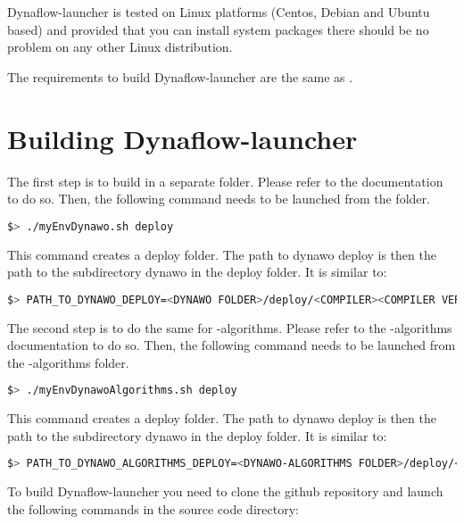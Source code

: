 \documentclass[a4paper, 12pt]{report}
\begin{document}
Dynaflow-launcher is tested on Linux platforms (Centos, Debian and Ubuntu based) and provided that you can install system packages there should be no problem on any other Linux distribution.

The requirements to build Dynaflow-launcher are the same as \Dynawo.

\section[Building Dynaflow-launcher]{Building Dynaflow-launcher}
\label{Dynaflow_launcher_Installation_Documentation_Building_Dynaflow_launcher}
The first step is to build \Dynawo in a separate folder. Please refer to the \Dynawo documentation to do so.
Then, the following command needs to be launched from the \Dynawo folder.

\begin{lstlisting}[language=bash, columns=fullflexible]
$> ./myEnvDynawo.sh deploy
\end{lstlisting}

This command creates a deploy folder. The path to dynawo deploy is then the path to the subdirectory dynawo in the deploy folder. It is similar to:

\begin{lstlisting}[language=bash, columns=fullflexible]
$> PATH_TO_DYNAWO_DEPLOY=<DYNAWO FOLDER>/deploy/<COMPILER><COMPILER VERSION>/shared/dynawo/
\end{lstlisting}

The second step is to do the same for \Dynawo-algorithms. Please refer to the \Dynawo-algorithms documentation to do so.
Then, the following command needs to be launched from the \Dynawo-algorithms folder.

\begin{lstlisting}[language=bash, columns=fullflexible]
$> ./myEnvDynawoAlgorithms.sh deploy
\end{lstlisting}

This command creates a deploy folder. The path to dynawo deploy is then the path to the subdirectory dynawo in the deploy folder. It is similar to:

\begin{lstlisting}[language=bash, columns=fullflexible]
$> PATH_TO_DYNAWO_ALGORITHMS_DEPLOY=<DYNAWO-ALGORITHMS FOLDER>/deploy/<COMPILER><COMPILER VERSION>/shared/dynawo/
\end{lstlisting}


To build Dynaflow-launcher you need to clone the github repository and launch the following commands in the source code directory:
\end{document}
